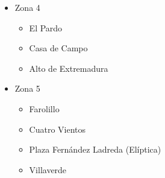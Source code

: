 \begin{itemize}
\begin{itemize}
	\end{itemize}
	\item Zona 4
	\begin{itemize}
		\item El Pardo
		\item Casa de Campo
		\item Alto de Extremadura
	\end{itemize}
	\item Zona 5
	\begin{itemize}
		\item Farolillo
		\item Cuatro Vientos
		\item Plaza Fernández Ladreda (Elíptica)
		\item Villaverde
	\end{itemize}
\end{itemize}



